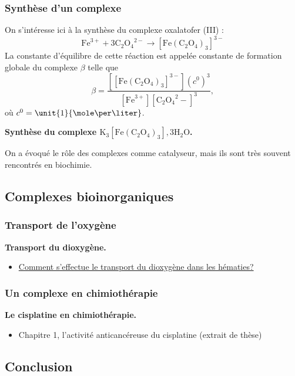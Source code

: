 \subsubsection{Synthèse d'un complexe}

On s'intéresse ici à la synthèse du complexe oxalatofer (III) :
\begin{equation*}
\mathrm{Fe}^{3+} + 3 \mathrm{C_2O_4}^{2-} \rightarrow \mathrm{[Fe(C_2O_4)_3]}^{3-}
\end{equation*}
La constante d'équilibre de cette réaction est appelée constante de formation globale du complexe $\beta$ telle que
\begin{equation*}
\beta = \frac{[\mathrm{[Fe(C_2O_4)_3]}^{3-}](c^0)^3}{[\mathrm{Fe}^{3+}][\mathrm{C_2O_4}^2-]^3},
\end{equation*}
où $c^0 = \unit{1}{\mole\per\liter}$.

\begin{experience}
\textbf{Synthèse du complexe $\mathrm{K_3[Fe(C_2O_4)_3],3H_2O}$.}
\end{experience}

\begin{transition}
On a évoqué le rôle des complexes comme catalyseur, mais ils sont très souvent rencontrés en biochimie.
\end{transition}

\subsection{Complexes bioinorganiques}

\subsubsection{Transport de l'oxygène}

\begin{slide}
\textbf{Transport du dioxygène.}
\end{slide}

\begin{itemize}
\item \href{https://www.rts.ch/decouverte/sante-et-medecine/corps-humain/9852272-comment-s-effectue-le-transport-du-dioxygene-dans-les-hematies-.html}{Comment s'effectue le transport du dioxygène dans les hématies?}
\end{itemize}

\subsubsection{Un complexe en chimiothérapie}

\begin{slide}
\textbf{Le cisplatine en chimiothérapie.}
\end{slide}
\begin{itemize}
\item Chapitre 1, l'activité anticancéreuse du cisplatine (extrait de thèse)
\end{itemize}

\subsection{Conclusion}